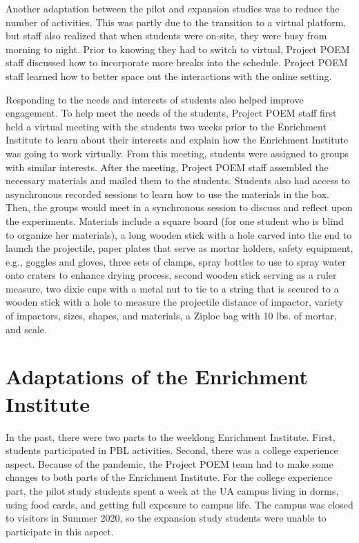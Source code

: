 \documentclass[11pt]{sig-alternate}
\begin{document}
\begin{large}
{Another adaptation between the pilot and expansion studies was to reduce the number of activities. This was partly due to the transition to a virtual platform, but staff also realized that when students were on-site, they were busy from morning to night. Prior to knowing they had to switch to virtual, Project POEM staff discussed how to incorporate more breaks into the schedule. Project POEM staff learned how to better space out the interactions with the online setting.

Responding to the needs and interests of students also helped improve engagement. To help meet the needs of the students, Project POEM staff first held a virtual meeting with the students two weeks prior to the Enrichment Institute to learn about their interests and explain how the Enrichment Institute was going to work virtually. From this meeting, students were assigned to groups with similar interests. After the meeting, Project POEM staff assembled the necessary materials and mailed them to the students. Students also had access to asynchronous recorded sessions to learn how to use the materials in the box. Then, the groups would meet in a synchronous session to discuss and reflect upon the experiments. Materials include a square board (for one student who is blind to organize her materials), a long wooden stick with a hole carved into the end to launch the projectile, paper plates that serve as mortar holders, safety equipment, e.g., goggles and gloves, three sets of clamps, spray bottles to use to spray water onto craters to enhance drying process, second wooden stick serving as a ruler measure, two dixie cups with a metal nut to tie to a string that is secured to a wooden stick with a hole to measure the projectile distance of impactor, variety of impactors, sizes, shapes, and materials, a Ziploc bag with 10 lbs. of mortar, and scale.

\section*{Adaptations of the Enrichment Institute}

In the past, there were two parts to the weeklong Enrichment Institute. First, students participated in PBL activities. Second, there was a college experience aspect. Because of the pandemic, the Project POEM team had to make some changes to both parts of the Enrichment Institute. For the college experience part, the pilot study students spent a week at the UA campus living in dorms, using food cards, and getting full exposure to campus life. The campus was closed to visitors in Summer 2020, so the expansion study students were unable to participate in this aspect.

}
\end{large}
\end{document}
